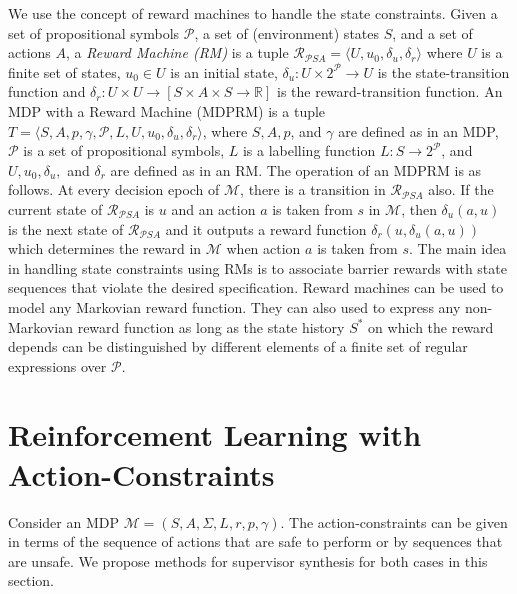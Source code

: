 \documentclass[letterpaper, 10 pt, conference]{ieeeconf}
\begin{document}
We use the concept of reward machines to handle the state constraints\cite{icarte2018using}. Given a set of propositional symbols $\mathcal{P}$, a set of (environment) states $S$, and a set of actions $A$, a \textit{Reward Machine (RM)} is a tuple $\mathcal{R}_{\mathcal{P}SA} = \langle U, u_0, \delta_u, \delta_r \rangle$ where $U$ is a finite set of states, $u_0 \in U$ is an initial state, $\delta_u : U \times 2^{\mathcal{P}} \rightarrow U$ is the state-transition function and $\delta_r :U\times U \rightarrow  [S\times A\times S \rightarrow \mathbb{R}]$ is the reward-transition function. An MDP with a Reward Machine (MDPRM) is a tuple $T = \langle S, A, p, \gamma, \mathcal{P}, L, U, u_0,\delta_u,\delta_r \rangle$, where $S, A, p$, and $\gamma$ are defined as in an MDP, $\mathcal{P}$ is a set of propositional symbols, $L$ is a labelling function $L : S \rightarrow 2^{\mathcal{P}}$, and $U, u_0, \delta_u,$ and $\delta_r$ are defined as in an RM. The operation of an MDPRM is as follows. At every decision epoch of $\mathcal{M}$, there is a transition in $\mathcal{R}_{\mathcal{P}SA}$ also. If the current state of $\mathcal{R}_{\mathcal{P}SA}$ is $u$ and an action $a$ is taken from $s$ in $\mathcal{M}$, then $\delta_u(a, u)$ is the next state of $\mathcal{R}_{\mathcal{P}SA}$ and it outputs a reward function $\delta_r(u, \delta_u(a, u))$ which determines the reward in $\mathcal{M}$ when action $a$ is taken from $s$. The main idea in handling state constraints using RMs is to associate barrier rewards with state sequences that violate the desired specification. Reward machines can be used to model any Markovian reward function. They can also used to express any non-Markovian reward function as long as the state history $S^*$ on which the reward depends can be distinguished by different elements of a finite set of regular expressions over $\mathcal{P}$. 

\section{Reinforcement Learning with Action-Constraints}\label{aa}
Consider an MDP $\mathcal{M} = (S, A, \Sigma, L, r, p, \gamma)$. The action-constraints can be given in terms of the sequence of actions that are safe to perform or by sequences that are unsafe. We propose methods for supervisor synthesis for both cases in this section. 
\end{document}
